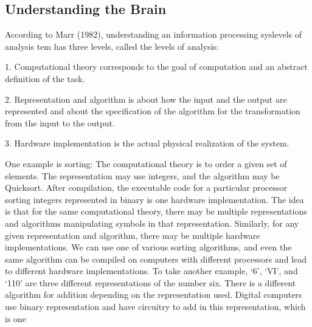 \subsection{Understanding the Brain}

According to Marr (1982), understanding an information processing syslevels of analysis tem has three levels, called the levels of analysis:

1. Computational theory corresponds to the goal of computation and an abstract definition of the task.

2. Representation and algorithm is about how the input and the output are represented and about the specification of the algorithm for the transformation from the input to the output.

3. Hardware implementation is the actual physical realization of the system.

One example is sorting: The computational theory is to order a given set of elements. The representation may use integers, and the algorithm may be Quicksort. After compilation, the executable code for a particular processor sorting integers represented in binary is one hardware implementation. The idea is that for the same computational theory, there may be multiple representations and algorithms manipulating symbols in that representation. Similarly, for any given representation and algorithm, there may be multiple hardware implementations. We can use one of various sorting algorithms, and even the same algorithm can be compiled on computers with different processors and lead to different hardware implementations. To take another example, ‘6’, ‘VI’, and ‘110’ are three different representations of the number six. There is a different algorithm for addition depending on the representation used. Digital computers use binary representation and have circuitry to add in this representation, which is one

